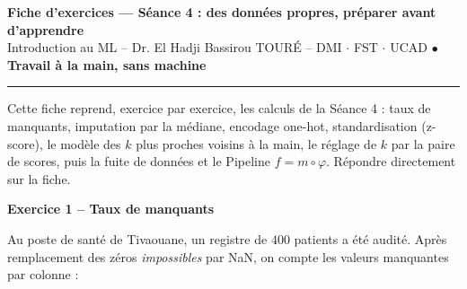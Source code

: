 \documentclass[10pt,a4paper]{article}
\begin{document}
\begin{center}
\textbf{\large Fiche d'exercices --- Séance 4 : des données propres, préparer avant d'apprendre}\\[0.05cm]
{\small Introduction au ML -- Dr. El Hadji Bassirou TOURÉ -- DMI $\cdot$ FST $\cdot$ UCAD \quad $\bullet$ \quad \textbf{Travail à la main, sans machine}}
\end{center}

\vspace{-0.15cm}
\hrule
\vspace{0.25cm}

{\small Cette fiche reprend, exercice par exercice, les calculs de la Séance 4 : taux de manquants, imputation par la médiane, encodage one-hot, standardisation (z-score), le modèle des $k$ plus proches voisins à la main, le réglage de $k$ par la paire de scores, puis la fuite de données et le Pipeline $f = m \circ \varphi$. Répondre directement sur la fiche.}

\vspace{0.2cm}


\vspace{0.45cm}

\textbf{\large Exercice 1 -- Taux de manquants}

\vspace{0.15cm}

Au poste de santé de Tivaouane, un registre de $400$ patients a été audité. Après remplacement des zéros \emph{impossibles} par NaN, on compte les valeurs manquantes par colonne :
\end{document}

